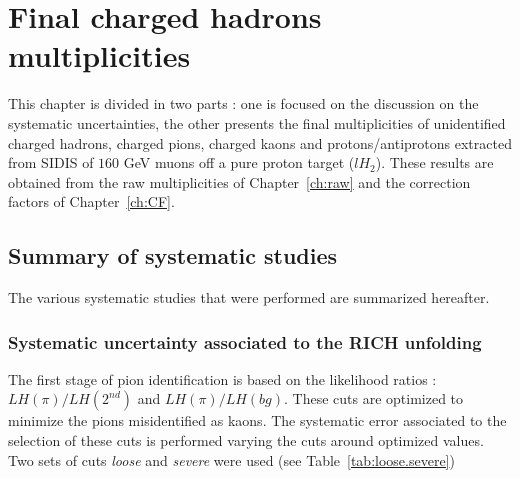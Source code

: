 
\chapter{Final charged hadrons multiplicities} %

\label{ch:mult} %


This chapter is divided in two parts : one is focused on the discussion on the systematic uncertainties, the other presents the final multiplicities of unidentified charged hadrons, charged pions, charged kaons and protons/antiprotons extracted from SIDIS of $160$ GeV muons off a pure proton target ($lH_2$). These results are obtained from the raw multiplicities of Chapter~\ref{ch:raw} and the correction factors of Chapter~\ref{ch:CF}.


\section{Summary of systematic studies}

The various systematic studies that were performed are summarized hereafter.


\subsection{Systematic uncertainty associated to the RICH unfolding}

The first stage of pion identification is based on the likelihood ratios : $LH(\pi)/LH(2^{nd})$ and $LH(\pi)/LH(bg)$. These cuts are optimized to minimize the
pions misidentified as kaons. The systematic error associated to the selection of these cuts is performed varying the cuts around optimized values. Two sets of
cuts \textit{loose} and \textit{severe} were used (see Table~\ref{tab:loose.severe})

